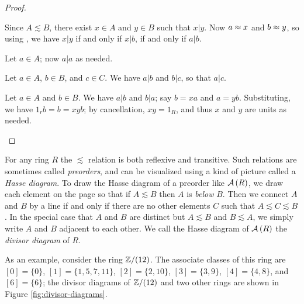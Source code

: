 \begin{proof}
\begin{inlineproplist}
\item Since \(A \lesssim B\), there exist \(x \in A\) and \(y \in B\) such that \(x|y\).
Now \(a \approx x\) and \(b \approx y\), so using , we have \(x|y\) if and only if \(x|b\), if and only if \(a|b\).
\item Let \(a \in A\); now \(a|a\) as needed.
\item Let \(a \in A\), \(b \in B\), and \(c \in C\).
We have \(a|b\) and \(b|c\), so that \(a|c\).
\item Let \(a \in A\) and \(b \in B\).
We have \(a|b\) and \(b|a\); say \(b = xa\) and \(a = yb\).
Substituting, we have \(1_rb = b = xyb\); by cancellation, \(xy = 1_R\), and thus \(x\) and \(y\) are units as needed.
\end{inlineproplist}
\end{proof}

For any ring \(R\) the \(\lesssim\) relation is both reflexive and transitive.
Such relations are sometimes called \emph{preorders}, and can be visualized using a kind of picture called a \emph{Hasse diagram}.
To draw the Hasse diagram of a preorder like \( \mathcal{A}\left(R\right) \), we draw each element on the page so that if \(A \lesssim B\) then \(A\) is \emph{below} \(B\).
Then we connect \(A\) and \(B\) by a line if and only if there are no other elements \(C\) such that \(A \lesssim C \lesssim B\).
In the special case that \(A\) and \(B\) are distinct but \(A \lesssim B\) and \(B \lesssim A\), we simply write \(A\) and \(B\) adjacent to each other.
We call the Hasse diagram of \( \mathcal{A}\left(R\right) \) the \emph{divisor diagram} of \(R\).

As an example, consider the ring \(\mathbb{Z}/(12)\).
The associate classes of this ring are \([0] = \{0\}\), \([1] = \{1,5,7,11\}\), \([2] = \{2,10\}\), \([3] = \{3,9\}\), \([4] = \{4,8\}\), and \([6] = \{6\}\); the divisor diagrams of \(\mathbb{Z}/(12)\) and two other rings are shown in Figure \ref{fig:divisor-diagrams}.

